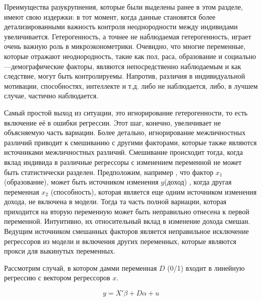 	
	Преимущества разукрупнения, которые были выделены ранее в этом разделе, имеют свою издержки: в тот момент, когда данные становятся более детализированными важность контроля неоднородности между индивидами увеличивается. Гетерогенность, а точнее не наблюдаемая гетерогенность, играет очень важную роль в микроэконометрики. Очевидно, что многие переменные, которые отражают неоднородность, такие как пол, раса, образование и социально---демографические факторы, являются непосредственно наблюдаемым и как следствие, могут быть контролируемы. Напротив, различия в индивидуальной мотивации, способностях, интеллекте и т.д. либо не наблюдается, либо, в лучшем случае, частично наблюдается.
	
	
	Самый простой выход из ситуации, это игнорирование гетерогенности, то есть включение её в ошибки регрессии. Этот шаг, конечно, увеличивает не объясняемую часть вариации. Более детально, игнорирование межличностных различий приводит к смешиванию с другими факторами, которые также являются источниками межличностных различий. Смешивание происходит тогда, когда вклад индивида в различные регрессоры с изменением переменной не может быть статистически разделен. Предположим, например , что фактор $x_{1}$ (образование), может быть источником изменения $y$(доход) , когда другая переменная $x_{2}$ (способность), которая является еще одним источником изменения дохода, не включена в модели. Тогда та часть полной вариации, которая приходится на вторую переменную может быть неправильно отнесена к первой переменной. Интуитивно, их относительный вклад в изменение дохода смешан. Ведущим источником смешанных факторов является неправильное исключение регрессоров из модели и включения других переменных, которые являются прокси для выкинутых переменных.
	
	
	Рассмотрим случай, в котором дамми переменная $D$ (0/1) входит в линейную регрессию с вектором регрессоров $x$.
	
\begin{equation}
y=X'\beta+D\alpha+u
\end{equation}


